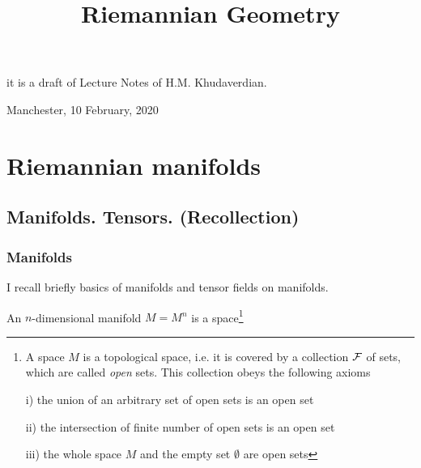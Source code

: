 \documentclass[12pt]{article}
\title{Riemannian Geometry}
\date{}
\theoremstyle{theorem}
\numberwithin{equation}{section}
\begin{document}
\maketitle

  \centerline {it is a draft of Lecture Notes of H.M. Khudaverdian.}

  \centerline { Manchester, 10 February,  2020}





\tableofcontents
{}
\newpage
{}




\section {Riemannian manifolds}


\subsection { Manifolds. Tensors. (Recollection)}

\subsubsection{Manifolds}



I recall briefly basics of manifolds 
and tensor fields on manifolds.

An $n$-dimensional manifold $M=M^n$ is a 
space\footnote
{A space $M$ is a topological space, i.e. it 
is covered by a collection $\cal F$ of sets,
which are called {\it open} sets.  This collection
obeys the following axioms

i) the union of an arbitrary set of open sets
is an open set

ii) the intersection of finite number of open sets
is an open set

iii) the whole space $M$ and the empty set 
$\emptyset$ are open sets
} 
\end{document}
